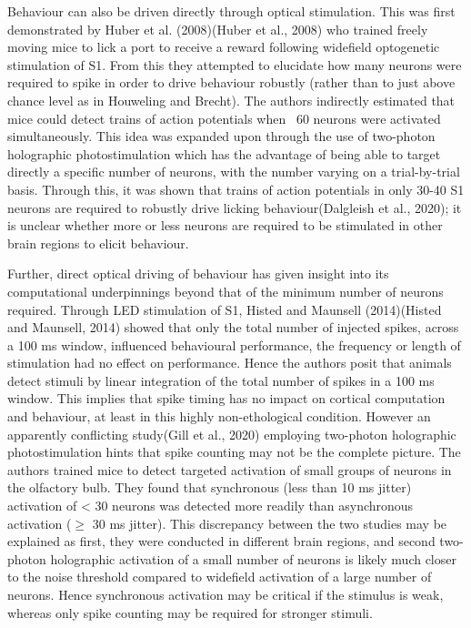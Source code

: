 Behaviour can also be driven directly through optical stimulation. This was first demonstrated by Huber et al. (2008)(Huber et al., 2008) who trained freely moving mice to lick a port to receive a reward following widefield optogenetic stimulation of S1. From this they attempted to elucidate how many neurons were required to spike in order to drive behaviour robustly (rather than to just above chance level as in Houweling and Brecht). The authors indirectly estimated that mice could detect trains of action potentials when ~60 neurons were activated simultaneously. This idea was expanded upon through the use of two-photon holographic photostimulation which has the advantage of being able to target directly a specific number of neurons, with the number varying on a trial-by-trial basis. Through this, it was shown that trains of action potentials in only 30-40 S1 neurons are required to robustly drive licking behaviour(Dalgleish et al., 2020); it is unclear whether more or less neurons are required to be stimulated in other brain regions to elicit behaviour. 

Further, direct optical driving of behaviour has given insight into its computational underpinnings beyond that of the minimum number of neurons required. Through LED stimulation of S1, Histed and Maunsell (2014)(Histed and Maunsell, 2014) showed that only the total number of injected spikes, across a 100 ms window, influenced behavioural performance, the frequency or length of stimulation had no effect on performance. Hence the authors posit that animals detect stimuli by linear integration of the total number of spikes in a 100 ms window. This implies that spike timing has no impact on cortical computation and behaviour, at least in this highly non-ethological condition. However an apparently conflicting study(Gill et al., 2020) employing two-photon holographic photostimulation hints that spike counting may not be the complete picture. The authors trained mice to detect targeted activation of small groups of neurons in the olfactory bulb. They found that synchronous (less than 10 ms jitter) activation of < 30 neurons was detected more readily than asynchronous activation ($\geqslant$ 30 ms jitter). This discrepancy between the two studies may be explained as first, they were conducted in different brain regions, and second two-photon holographic activation of a small number of neurons is likely much closer to the noise threshold compared to widefield activation of a large number of neurons. Hence synchronous activation may be critical if the stimulus is weak, whereas only spike counting may be required for stronger stimuli.

